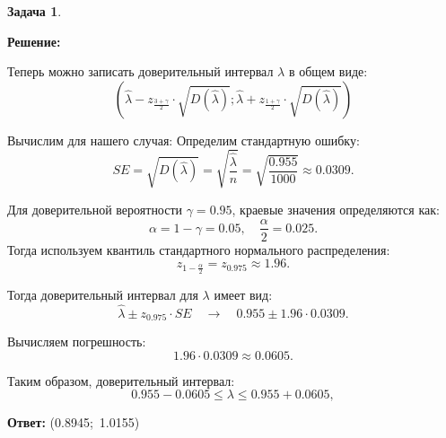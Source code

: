 \documentclass[a4paper,11pt]{article}
\newenvironment{shdd}{\begin{mdframed}[backgroundcolor=shadecolor]}{\end{mdframed}}
\theoremstyle{definition}
\newtheorem{problem}{Задача}\setlength{\parindent}{0pt}
\newenvironment{solution}
{\begin{shdd}\textbf{Решение:}\par\setlength{\parindent}{0pt}}
{\end{shdd}}
\newenvironment{answer}
{\par\noindent\textbf{Ответ:}}
{\par}
\begin{document}
\begin{problem}
\begin{solution}
            Теперь можно записать доверительный интервал \(\lambda\) в общем виде:
            \[
            (\hat{\lambda} - z_{\frac{3 + \gamma}{2}} \cdot \sqrt{D(\hat{\lambda})}; \hat{\lambda} + z_{\frac{1+\gamma}{2}} \cdot \sqrt{D(\hat{\lambda})})
            \]

            Вычислим для нашего случая: 
            Определим стандартную ошибку:
            \[
            SE = \sqrt{D(\hat{\lambda})} = \sqrt{\frac{\hat{\lambda}}{n}} = \sqrt{\frac{0.955}{1000}} \approx 0.0309.
            \]
            
            Для доверительной вероятности \(\gamma = 0.95\), краевые значения определяются как:
            \[
            \alpha = 1 - \gamma = 0.05,\quad \frac{\alpha}{2} = 0.025.
            \]
            Тогда используем квантиль стандартного нормального распределения:
            \[
            z_{1 - \frac{\alpha}{2}} = z_{0.975} \approx 1.96.
            \]
            
            Тогда доверительный интервал для \(\lambda\) имеет вид:
            \[
            \hat{\lambda} \pm z_{0.975} \cdot SE \quad \rightarrow \quad 0.955 \pm 1.96 \cdot 0.0309.
            \]
            
            Вычисляем погрешность:
            \[
            1.96 \cdot 0.0309 \approx 0.0605.
            \]
            
            Таким образом, доверительный интервал:
            \[
            0.955 - 0.0605 \leq \lambda \leq 0.955 + 0.0605,
            \]
            
    \end{solution}

    \begin{answer}
        (0.8945;\, 1.0155)
    \end{answer}

\end{problem}
\end{document}
